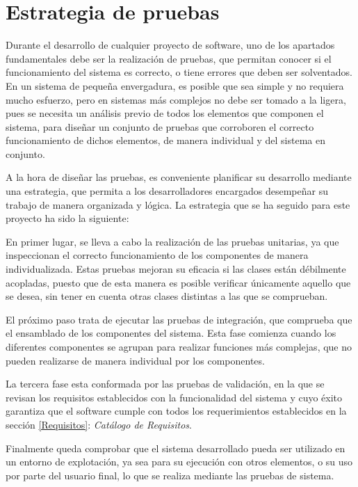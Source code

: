 
\section{Estrategia de pruebas}
Durante el desarrollo de cualquier proyecto de software, uno de los apartados fundamentales debe ser 
la realización de pruebas, que permitan conocer si el funcionamiento del sistema es correcto, o tiene 
errores que deben ser solventados. En un sistema de pequeña envergadura, es posible que sea simple y 
no requiera mucho esfuerzo, pero en sistemas más complejos no debe ser tomado a la ligera, pues 
se necesita un análisis previo de todos los elementos que componen el sistema, para diseñar un 
conjunto de pruebas que corroboren el correcto funcionamiento de dichos elementos, de manera individual y 
del sistema en conjunto. \newpage

A la hora de diseñar las pruebas, es conveniente planificar su desarrollo mediante una estrategia, 
que permita a los desarrolladores encargados desempeñar su trabajo de manera organizada y lógica.
La estrategia que se ha seguido para este proyecto ha sido la siguiente:\medskip

En primer lugar, se lleva a cabo la realización de las pruebas unitarias, ya que inspeccionan 
el correcto funcionamiento de los componentes de manera individualizada. Estas pruebas mejoran su 
eficacia si las clases están débilmente acopladas, puesto que de esta manera es posible verificar 
únicamente aquello que se desea, sin tener en cuenta otras clases distintas a las que se comprueban.\medskip

El próximo paso trata de ejecutar las pruebas de integración, que comprueba que el ensamblado de los 
componentes del sistema. Esta fase comienza cuando los diferentes componentes se agrupan para realizar 
funciones más complejas, que no pueden realizarse de manera individual por los componentes. \medskip

La tercera fase esta conformada por las pruebas de validación, en la que se revisan los requisitos
establecidos con la funcionalidad del sistema y cuyo éxito garantiza que el software cumple con todos 
los requerimientos establecidos en la sección \ref*{Requisitos}: \textit{Catálogo de Requisitos}. \medskip

Finalmente queda comprobar que el sistema desarrollado pueda ser utilizado en un entorno de explotación, 
ya sea para su ejecución con otros elementos, o su uso por parte del usuario final, lo que se realiza 
mediante las pruebas de sistema.